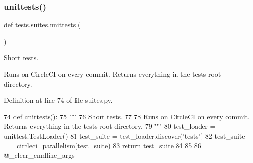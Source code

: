 \subsubsection{\texorpdfstring{unittests()}{unittests()}}
{\footnotesize\ttfamily def tests.\+suites.\+unittests (\begin{DoxyParamCaption}{ }\end{DoxyParamCaption})}

\begin{DoxyVerb}Short tests.

Runs on CircleCI on every commit. Returns everything in the tests root directory.
\end{DoxyVerb}
 

Definition at line 74 of file suites.\+py.


\begin{DoxyCode}
74 \textcolor{keyword}{def }\hyperlink{namespacetests_1_1suites_a02a7d577493ceb024319292b96e13265}{unittests}():
75     \textcolor{stringliteral}{"""}
76 \textcolor{stringliteral}{    Short tests.}
77 \textcolor{stringliteral}{}
78 \textcolor{stringliteral}{    Runs on CircleCI on every commit. Returns everything in the tests root directory.}
79 \textcolor{stringliteral}{    """}
80     test\_loader = unittest.TestLoader()
81     test\_suite = test\_loader.discover(\textcolor{stringliteral}{'tests'})
82     test\_suite = \_circleci\_parallelism(test\_suite)
83     \textcolor{keywordflow}{return} test\_suite
84 
85 
86 @\_clear\_cmdline\_args
\end{DoxyCode}
